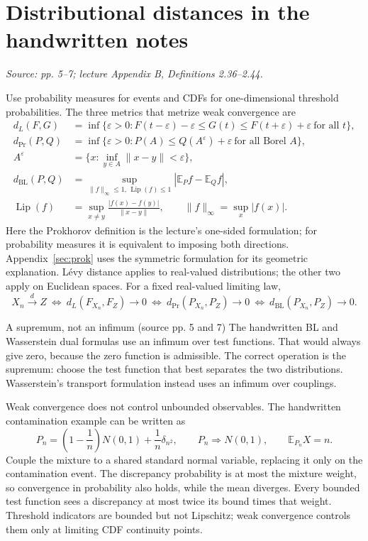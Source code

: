 \documentclass[12pt]{article}
\newcommand{\E}{\mathbb E}
\DeclareMathOperator{\Lip}{Lip}
\begin{document}
\section{Distributional distances in the handwritten notes}
\textit{Source: pp. 5--7; lecture Appendix B, Definitions 2.36--2.44.}

Use probability measures for events and CDFs for one-dimensional threshold
probabilities. The three metrics that metrize weak convergence are
\begin{align}
 d_L(F,G)&=\inf\{\varepsilon>0:
 F(t-\varepsilon)-\varepsilon\le G(t)\le
 F(t+\varepsilon)+\varepsilon\ \text{for all }t\},\\
 d_{\mathrm{Pr}}(P,Q)&=\inf\{\varepsilon>0:
 P(A)\le Q(A^\varepsilon)+\varepsilon\ \text{for all Borel }A\},\\
 A^\varepsilon&=\{x:\inf_{y\in A}\|x-y\|<\varepsilon\},\\
 d_{\mathrm{BL}}(P,Q)&=\sup_{\|f\|_\infty\le1,\,\Lip(f)\le1}
 |\E_P f-\E_Q f|,\\
 \Lip(f)&=\sup_{x\ne y}\frac{|f(x)-f(y)|}{\|x-y\|},
 \qquad\|f\|_\infty=\sup_x|f(x)|.
\end{align}
Here the Prokhorov definition is the lecture's one-sided formulation; for
probability measures it is equivalent to imposing both directions. Appendix~\ref{sec:prok}
uses the symmetric formulation for its geometric explanation. L\'evy distance
applies to real-valued distributions; the other two apply on Euclidean spaces.
For a fixed real-valued limiting law,
\begin{equation}
 X_n\xrightarrow{d}Z
 \ \Longleftrightarrow\ d_L(F_{X_n},F_Z)\to0
 \ \Longleftrightarrow\ d_{\mathrm{Pr}}(P_{X_n},P_Z)\to0
 \ \Longleftrightarrow\ d_{\mathrm{BL}}(P_{X_n},P_Z)\to0.
\end{equation}
\begin{correctionbox}{A supremum, not an infimum (source pp. 5 and 7)}
The handwritten BL and Wasserstein dual formulas use an infimum over test
functions. That would always give zero, because the zero function is
admissible. The correct operation is the supremum: choose the test function
that best separates the two distributions. Wasserstein's transport
formulation instead uses an infimum over couplings.
\end{correctionbox}

Weak convergence does not control unbounded observables. The handwritten
contamination example can be written as
\begin{equation}
 P_n=\left(1-\frac1n\right)N(0,1)+\frac1n\delta_{n^2},
 \qquad P_n\Rightarrow N(0,1),\qquad \E_{P_n}X=n.
\end{equation}
Couple the mixture to a shared standard normal variable, replacing it only
on the contamination event. The discrepancy probability is at most the
mixture weight, so convergence in probability also holds, while the mean
diverges. Every bounded test function sees a discrepancy at most twice its
bound times that weight. Threshold indicators are bounded but not Lipschitz;
weak convergence controls them only at limiting CDF continuity points.
\end{document}
